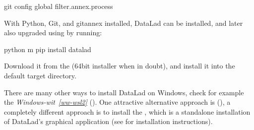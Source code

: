 \begin{description}
\begin{sphinxVerbatim}[commandchars=\\\{\}]
 git config \PYGZhy{}\PYGZhy{}global filter.annex.process 
\end{sphinxVerbatim}

\sphinxAtStartPar
With Python, Git, and git\sphinxhyphen{}annex installed, DataLad can be installed, and later also
upgraded using  by running:

\begin{sphinxVerbatim}[commandchars=\\\{\}]
 python \PYGZhy{}m pip install datalad
\end{sphinxVerbatim}

\ignorespaces 
\sphinxAtStartPar
Download it from the  (64bit
installer when in doubt), and install it into the default target directory.

\end{description}

\sphinxAtStartPar
There are many other ways to install DataLad on Windows, check for example the
\textit{Windows-wit}~{\windowswiticoninline}\textit{\ref{ww-wsl2}} {\hyperref[\detokenize{intro/installation:ww-wsl2}]{}} ().
One attractive alternative approach is {\hyperref[\detokenize{intro/installation:conda}]{}} (), a completely different approach is to install the {\hyperref[\detokenize{glossary:term-DataLad-Gooey}]{}}, which is a standalone installation of DataLad’s graphical application (see  for installation instructions).

